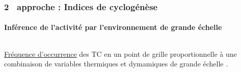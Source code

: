 \documentclass[aspectratio=169, usepdftitle=false, xcolor={dvipsnames}, 9pt,table]{beamer}
\begin{document}
\begin{frame}[t]
    \frametitle{2\ieme~ approche : Indices de cyclogénèse}
    \framesubtitle{Inférence de l'activité par l'environnement de grande échelle}
    \begin{columns}[t]
        \begin{column}{0.66\textwidth}
            \begin{definition}
                \scriptsize
                \underline{Fréquence d'occurrence} des TC en un point de grille proportionnelle à une \mbox{combinaison} de variables \alert{thermiques} et
                \mbox{\alert{dymamiques}} de grande échelle \parencite{gray_tropical_1975}.
            \end{definition}
            \begin{columns}[t]
                \setlength{\leftmargini}{2ex}
                \begin{column}{0.45\textwidth}
                \end{column}
                \begin{column}{0.45\textwidth}
\end{column}
\end{columns}
\end{column}
\end{columns}
\end{frame}
\end{document}
